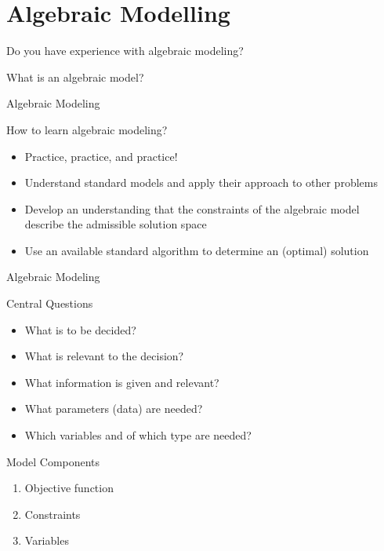 \documentclass[aspectratio=1610,12pt]{beamer}
\begin{document}
\section{Algebraic Modelling}

\begin{frame}[standout]
   Do you have experience with algebraic modeling?
\end{frame}

\begin{frame}[standout]
   What is an algebraic model?
\end{frame}

\begin{frame}{Algebraic Modeling}
\begin{block}{How to learn algebraic modeling?}
    \begin{itemize}
    	\item Practice, practice, and practice!
    	\item Understand standard models and apply their approach to other problems
    	\item Develop an understanding that the constraints of the algebraic model describe the admissible solution space
    	\item Use an available standard algorithm to determine an (optimal) solution
    \end{itemize}
\end{block}
\end{frame}

\begin{frame}{Algebraic Modeling}
    \begin{block}{Central Questions}
        \begin{itemize}
    	    \item What is to be decided?
    	    \item What is relevant to the decision?
    	    \item What information is given and relevant?
    	    \item What parameters (data) are needed?
    	    \item Which variables and of which type are needed?
        \end{itemize}
    \end{block}
    \begin{block}{Model Components}
    \begin{enumerate}
    	\item Objective function
    	\item Constraints
    	\item Variables
    \end{enumerate}
	\end{block}
\end{frame}
\end{document}
